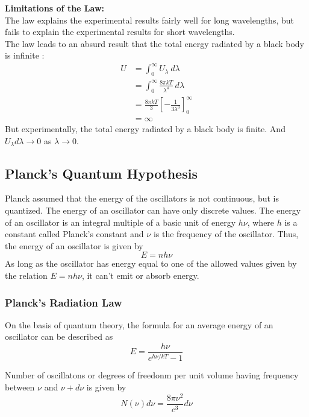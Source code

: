 \documentclass[12pt]{article}
\numberwithin{equation}{subsection}
\begin{document}
\textbf{Limitations of the Law:} \\
The law explains the experimental results fairly well for long wavelengths, but fails to explain the experimental results for short wavelengths. \\
The law leads to an absurd result that the total energy radiated by a black body is infinite :
\begin{align*}
    U &= \int_{0}^{\infty} {U_{\lambda}} \: d{\lambda} \\
    &= \int_{0}^{\infty} {\frac{8\pi kT}{\lambda^4}} \: d{\lambda} \\
    &= \frac{8\pi kT}{3} \left[ -\frac{1}{3\lambda^3} \right]_{0}^{\infty} \\
    &= \infty
\end{align*}
But experimentally, the total energy radiated by a black body is finite. And $U_{\lambda} d\lambda \to 0$ as $\lambda \to 0$.

\subsection{Planck's Quantum Hypothesis}
Planck assumed that the energy of the oscillators is not continuous, but is quantized. The energy of an oscillator can have only discrete values. The energy of an oscillator is an integral multiple of a basic unit of energy $h\nu$, where $h$ is a constant called Planck's constant and $\nu$ is the frequency of the oscillator. Thus, the energy of an oscillator is given by
\begin{equation}
    E = nh\nu
\end{equation}
As long as the oscillator has energy equal to one of the allowed values given by the relation $E=nh\nu$, it can't emit or absorb energy.

\subsubsection{Planck's Radiation Law}
On the basis of quantum theory, the formula for an average energy of an oscillator can be described as
\begin{equation}
    \boxed{ E = \frac{h\nu}{e^{h\nu/kT}-1} }
\end{equation}

Number of oscillatons or degrees of freedonm per unit volume having frequency between $\nu$ and $\nu+d\nu$ is given by
\begin{equation}
    N(\nu) d\nu = \frac{8\pi\nu^2}{c^3} d\nu
\end{equation}
\end{document}
